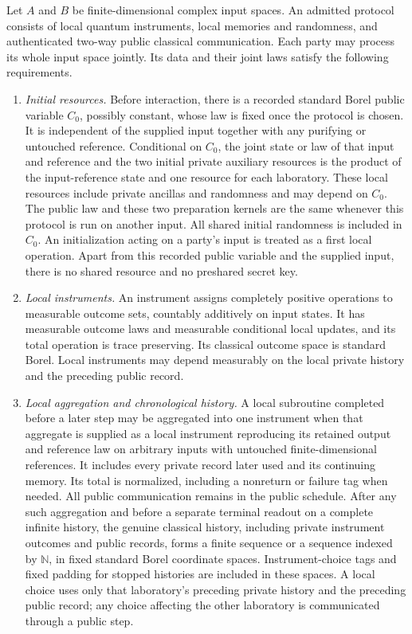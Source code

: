 \begin{definition}\label{def:protocol}
Let $A$ and $B$ be finite-dimensional complex input spaces.  An admitted
protocol consists of local quantum instruments, local memories and
randomness, and authenticated two-way public classical communication.
Each party may process its whole input space jointly.  Its data and their
joint laws satisfy the following requirements.
\begin{enumerate}
\item\label{protocol:initial} \textit{Initial resources.}
Before interaction,
there is a recorded standard Borel public variable $C_0$, possibly constant,
whose law is fixed once the protocol is chosen.  It is independent of the
supplied input together with any purifying or untouched reference.
Conditional on $C_0$, the joint state or law of that input and reference
and the two initial private auxiliary resources is the product of the
input-reference state and one resource for each laboratory.  These local
resources include private ancillas and randomness and may depend on $C_0$.
The public law and these two preparation kernels are the same whenever
this protocol is run on another input.  All shared initial randomness is
included in $C_0$.
An initialization acting on a party's input is treated as a first local
operation.  Apart from this recorded public variable and the supplied
input, there is no shared resource and no preshared secret key.

\item\label{protocol:instruments} \textit{Local instruments.}
An instrument assigns completely positive operations to measurable
outcome sets, countably additively on input states.  It has measurable
outcome laws and measurable conditional local updates, and its total
operation is trace preserving.  Its classical outcome space is standard
Borel.  Local instruments may depend measurably on the local private
history and the preceding public record.

\item\label{protocol:history} \textit{Local aggregation and chronological history.}
A local subroutine completed before a later step may be aggregated into
one instrument when that aggregate is supplied as a local instrument
reproducing its retained output and reference law on arbitrary inputs with
untouched finite-dimensional references.  It includes every private record
later used and its continuing memory.  Its total is normalized, including
a nonreturn or failure tag when needed.
All public communication remains in the public schedule.  After any such
aggregation and before a separate terminal readout on a complete infinite
history, the genuine classical history, including private instrument
outcomes and public records, forms a finite sequence or a sequence indexed
by $\mathbb N$, in fixed standard Borel coordinate spaces.  Instrument-choice
tags and fixed padding for stopped histories are included in these spaces.
A local choice uses only that laboratory's preceding private history and
the preceding public record; any choice affecting the other laboratory is
communicated through a public step.


\end{enumerate}
\end{definition}
